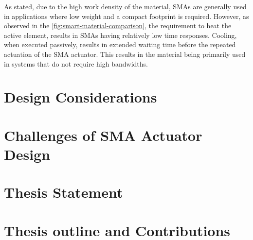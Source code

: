 As stated, due to the high work density of the material, SMAs are generally used in applications where low weight and a compact footprint is required. However, as observed in the \cref{fig:smart-material-comparison}, the requirement to heat the active element, results in SMAs having relatively low time responses. Cooling, when executed passively, results in extended waiting time before the repeated actuation of the SMA actuator. This results in the material being primarily used in systems that do not require high bandwidths. 





\section*{Design Considerations}

\section*{Challenges of SMA Actuator Design}

\section*{Thesis Statement}

\section*{Thesis outline and Contributions}
